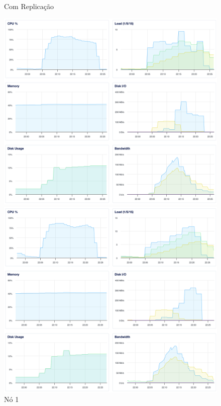 \begin{figure}[H]
	\captionsetup{labelformat=empty}
	\caption{Com Replicação}
  \centering
  \begin{minipage}{0.32\linewidth}
    \centering
    \includegraphics[width=\linewidth]{imgs/3-3-01.png}
    \caption{Nó 1}
  \end{minipage}
  \hfill
  \begin{minipage}{0.32\linewidth}
    \centering
    \includegraphics[width=\linewidth]{imgs/3-3-02.png}

\end{minipage}
\end{figure}
